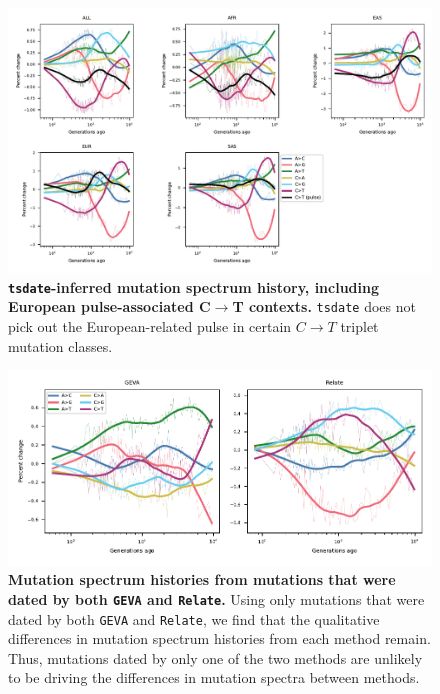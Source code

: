 \documentclass[]{article}
\newcommand{\GEVA}{\texttt{GEVA}\xspace}
\newcommand{\tsdate}{\texttt{tsdate}\xspace}
\newcommand{\relate}{\texttt{Relate}\xspace}
\begin{document}
\begin{figure}[ht!]
    \centering
    \includegraphics[width=\textwidth]{../plots/spectrum_history.tsdate.max_age.10000.CtoTpulse.pdf}
    \caption{
        \textbf{\tsdate-inferred mutation spectrum history, including European
            pulse-associated C$\rightarrow$T contexts.}
        \tsdate does not pick out the European-related pulse in certain $C\rightarrow T$
        triplet mutation classes.
    }
    \label{fig:tsdate-spectra-singletons}
\end{figure}


\begin{figure}[ht!]
    \centering
    \includegraphics{../plots/overlapping.geva.relate.pdf}
    \caption{
        \textbf{Mutation spectrum histories from mutations that were dated by
        both \GEVA and \relate.}
        Using only mutations that were dated by both \GEVA and \relate, we find
        that the qualitative differences in mutation spectrum histories from
        each method remain. Thus, mutations dated by only one of the two methods
        are unlikely to be driving the differences in mutation spectra between
        methods.
    }
    \label{fig:overlap-spectra}
\end{figure}
\end{document}

